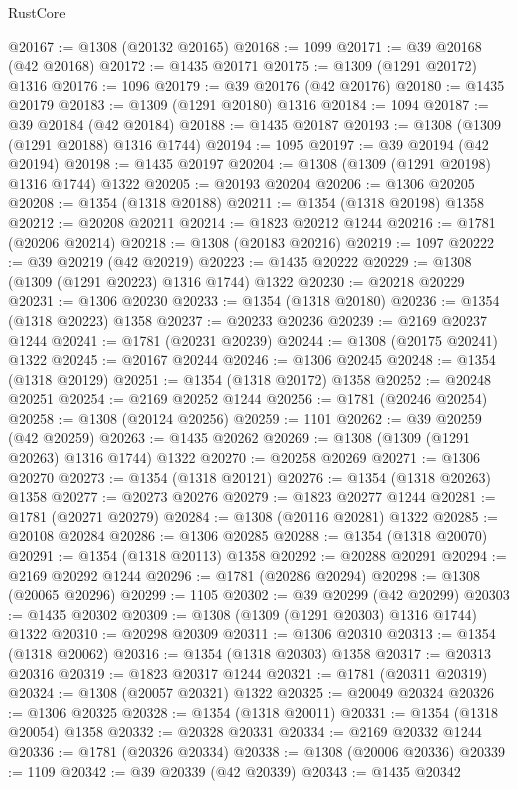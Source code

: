 \begin{lexlean}{RustCore}
\begin{coremodule}
@20167 := @1308 (@20132 @20165)
@20168 := 1099
@20171 := @39 @20168 (@42 @20168)
@20172 := @1435 @20171
@20175 := @1309 (@1291 @20172) @1316
@20176 := 1096
@20179 := @39 @20176 (@42 @20176)
@20180 := @1435 @20179
@20183 := @1309 (@1291 @20180) @1316
@20184 := 1094
@20187 := @39 @20184 (@42 @20184)
@20188 := @1435 @20187
@20193 := @1308 (@1309 (@1291 @20188) @1316 @1744)
@20194 := 1095
@20197 := @39 @20194 (@42 @20194)
@20198 := @1435 @20197
@20204 := @1308 (@1309 (@1291 @20198) @1316 @1744) @1322
@20205 := @20193 @20204
@20206 := @1306 @20205
@20208 := @1354 (@1318 @20188)
@20211 := @1354 (@1318 @20198) @1358
@20212 := @20208 @20211
@20214 := @1823 @20212 @1244
@20216 := @1781 (@20206 @20214)
@20218 := @1308 (@20183 @20216)
@20219 := 1097
@20222 := @39 @20219 (@42 @20219)
@20223 := @1435 @20222
@20229 := @1308 (@1309 (@1291 @20223) @1316 @1744) @1322
@20230 := @20218 @20229
@20231 := @1306 @20230
@20233 := @1354 (@1318 @20180)
@20236 := @1354 (@1318 @20223) @1358
@20237 := @20233 @20236
@20239 := @2169 @20237 @1244
@20241 := @1781 (@20231 @20239)
@20244 := @1308 (@20175 @20241) @1322
@20245 := @20167 @20244
@20246 := @1306 @20245
@20248 := @1354 (@1318 @20129)
@20251 := @1354 (@1318 @20172) @1358
@20252 := @20248 @20251
@20254 := @2169 @20252 @1244
@20256 := @1781 (@20246 @20254)
@20258 := @1308 (@20124 @20256)
@20259 := 1101
@20262 := @39 @20259 (@42 @20259)
@20263 := @1435 @20262
@20269 := @1308 (@1309 (@1291 @20263) @1316 @1744) @1322
@20270 := @20258 @20269
@20271 := @1306 @20270
@20273 := @1354 (@1318 @20121)
@20276 := @1354 (@1318 @20263) @1358
@20277 := @20273 @20276
@20279 := @1823 @20277 @1244
@20281 := @1781 (@20271 @20279)
@20284 := @1308 (@20116 @20281) @1322
@20285 := @20108 @20284
@20286 := @1306 @20285
@20288 := @1354 (@1318 @20070)
@20291 := @1354 (@1318 @20113) @1358
@20292 := @20288 @20291
@20294 := @2169 @20292 @1244
@20296 := @1781 (@20286 @20294)
@20298 := @1308 (@20065 @20296)
@20299 := 1105
@20302 := @39 @20299 (@42 @20299)
@20303 := @1435 @20302
@20309 := @1308 (@1309 (@1291 @20303) @1316 @1744) @1322
@20310 := @20298 @20309
@20311 := @1306 @20310
@20313 := @1354 (@1318 @20062)
@20316 := @1354 (@1318 @20303) @1358
@20317 := @20313 @20316
@20319 := @1823 @20317 @1244
@20321 := @1781 (@20311 @20319)
@20324 := @1308 (@20057 @20321) @1322
@20325 := @20049 @20324
@20326 := @1306 @20325
@20328 := @1354 (@1318 @20011)
@20331 := @1354 (@1318 @20054) @1358
@20332 := @20328 @20331
@20334 := @2169 @20332 @1244
@20336 := @1781 (@20326 @20334)
@20338 := @1308 (@20006 @20336)
@20339 := 1109
@20342 := @39 @20339 (@42 @20339)
@20343 := @1435 @20342

\end{coremodule}
\end{lexlean}
